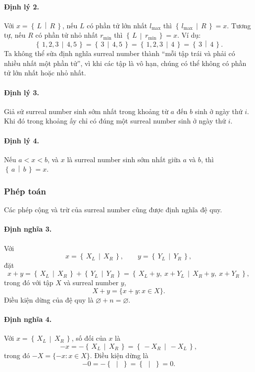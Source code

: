\documentclass[11pt]{article}
\newcommand{\Gpos}[2]{\left\{\,#1\,\middle|\,#2\,\right\}}
\begin{document}
\paragraph{Định lý 2.}
Với \(x=\Gpos{L}{R}\), nếu \(L\) có phần tử lớn nhất \(l_{\max}\) thì
\(\Gpos{l_{\max}}{R}=x\). Tương tự, nếu \(R\) có phần tử nhỏ nhất
\(r_{\min}\) thì \(\Gpos{L}{r_{\min}}=x\). Ví dụ:
\[
  \Gpos{1,2,3}{4,5}=\Gpos{3}{4,5}=\Gpos{1,2,3}{4}=\Gpos{3}{4}.
\]
Ta không thể sửa định nghĩa surreal number thành ``mỗi tập trái và phải có
nhiều nhất một phần tử'', vì khi các tập là vô hạn, chúng có thể không có phần
tử lớn nhất hoặc nhỏ nhất.

\paragraph{Định lý 3.}
Giả sử surreal number sinh sớm nhất trong khoảng từ \(a\) đến \(b\) sinh ở
ngày thứ \(i\). Khi đó trong khoảng ấy chỉ có đúng một surreal number sinh ở
ngày thứ \(i\).

\paragraph{Định lý 4.}
Nếu \(a<x<b\), và \(x\) là surreal number sinh sớm nhất giữa \(a\) và \(b\),
thì \(\Gpos{a}{b}=x\).

\subsubsection{Phép toán}

Các phép cộng và trừ của surreal number cũng được định nghĩa đệ quy.

\paragraph{Định nghĩa 3.}
Với
\[
  x=\Gpos{X_L}{X_R},\qquad y=\Gpos{Y_L}{Y_R},
\]
đặt
\[
  x+y
  =\Gpos{X_L}{X_R}+\Gpos{Y_L}{Y_R}
  =\Gpos{X_L+y,\ x+Y_L}{X_R+y,\ x+Y_R},
\]
trong đó với tập \(X\) và surreal number \(y\),
\[
  X+y=\{x+y:x\in X\}.
\]
Điều kiện dừng của đệ quy là \(\varnothing+n=\varnothing\).

\paragraph{Định nghĩa 4.}
Với \(x=\Gpos{X_L}{X_R}\), số đối của \(x\) là
\[
  -x=-\Gpos{X_L}{X_R}=\Gpos{-X_R}{-X_L},
\]
trong đó \(-X=\{-x:x\in X\}\). Điều kiện dừng là
\[
  -0=-\Gpos{}{}=\Gpos{}{}=0.
\]
\end{document}
